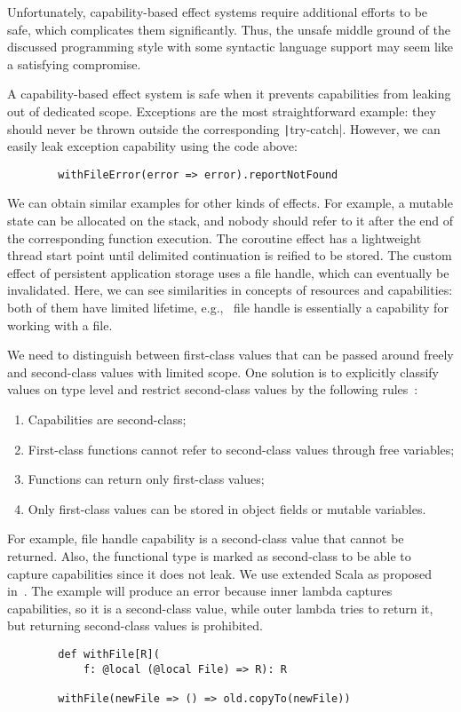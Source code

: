 \documentclass[conference]{IEEEtran}
\begin{document}
    Unfortunately, capability-based effect systems require additional efforts to be safe, which complicates them significantly.
    Thus, the unsafe middle ground of the discussed programming style with some syntactic language support may seem like a satisfying compromise.

    A capability-based effect system is safe when it prevents capabilities from leaking out of dedicated scope.
    Exceptions are the most straightforward example: they should never be thrown outside the corresponding \texttt|try-catch|.
    However, we can easily leak exception capability using the code above:
    \begin{verbatim}
        withFileError(error => error).reportNotFound
    \end{verbatim}

    We can obtain similar examples for other kinds of effects.
    For example, a mutable state can be allocated on the stack, and nobody should refer to it after the end of the corresponding function execution.
    The coroutine effect has a lightweight thread start point until delimited continuation is reified to be stored.
    The custom effect of persistent application storage uses a file handle, which can eventually be invalidated.
    Here, we can see similarities in concepts of resources and capabilities: both of them have limited lifetime, e.g., \ file handle is essentially a capability for working with a file.

    We need to distinguish between first-class values that can be passed around freely and second-class values with limited scope.
    One solution is to explicitly classify values on type level and restrict second-class values by the following rules~\cite{osvald2016gentrification}:
    \begin{enumerate}
        \item Capabilities are second-class;
        \item First-class functions cannot refer to second-class values through free variables;
        \item Functions can return only first-class values;
        \item Only first-class values can be stored in object fields or mutable variables.
    \end{enumerate}

    For example, file handle capability is a second-class value that cannot be returned.
    Also, the functional type is marked as second-class to be able to capture capabilities since it does not leak.
    We use extended Scala as proposed in~\cite{osvald2016gentrification}.
    The example will produce an error because inner lambda captures capabilities, so it is a second-class value, while outer lambda tries to return it, but returning second-class values is prohibited.
    \begin{verbatim}
        def withFile[R](
            f: @local (@local File) => R): R

        withFile(newFile => () => old.copyTo(newFile))
    \end{verbatim}
\end{document}
